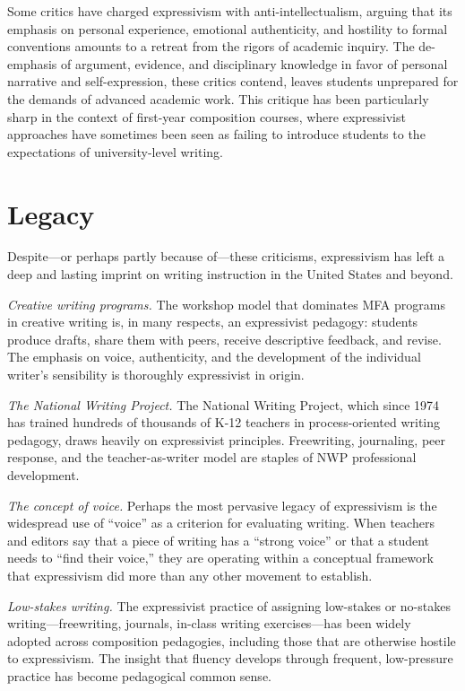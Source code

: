 \documentclass[12pt]{article}
\begin{document}
Some critics have charged expressivism with anti-intellectualism, arguing that its emphasis on personal experience, emotional authenticity, and hostility to formal conventions amounts to a retreat from the rigors of academic inquiry. The de-emphasis of argument, evidence, and disciplinary knowledge in favor of personal narrative and self-expression, these critics contend, leaves students unprepared for the demands of advanced academic work. This critique has been particularly sharp in the context of first-year composition courses, where expressivist approaches have sometimes been seen as failing to introduce students to the expectations of university-level writing.

\section{Legacy}

Despite---or perhaps partly because of---these criticisms, expressivism has left a deep and lasting imprint on writing instruction in the United States and beyond.

\textit{Creative writing programs.} The workshop model that dominates MFA programs in creative writing is, in many respects, an expressivist pedagogy: students produce drafts, share them with peers, receive descriptive feedback, and revise. The emphasis on voice, authenticity, and the development of the individual writer's sensibility is thoroughly expressivist in origin.

\textit{The National Writing Project.} The National Writing Project, which since 1974 has trained hundreds of thousands of K-12 teachers in process-oriented writing pedagogy, draws heavily on expressivist principles. Freewriting, journaling, peer response, and the teacher-as-writer model are staples of NWP professional development.

\textit{The concept of voice.} Perhaps the most pervasive legacy of expressivism is the widespread use of ``voice'' as a criterion for evaluating writing. When teachers and editors say that a piece of writing has a ``strong voice'' or that a student needs to ``find their voice,'' they are operating within a conceptual framework that expressivism did more than any other movement to establish.

\textit{Low-stakes writing.} The expressivist practice of assigning low-stakes or no-stakes writing---freewriting, journals, in-class writing exercises---has been widely adopted across composition pedagogies, including those that are otherwise hostile to expressivism. The insight that fluency develops through frequent, low-pressure practice has become pedagogical common sense.
\end{document}
